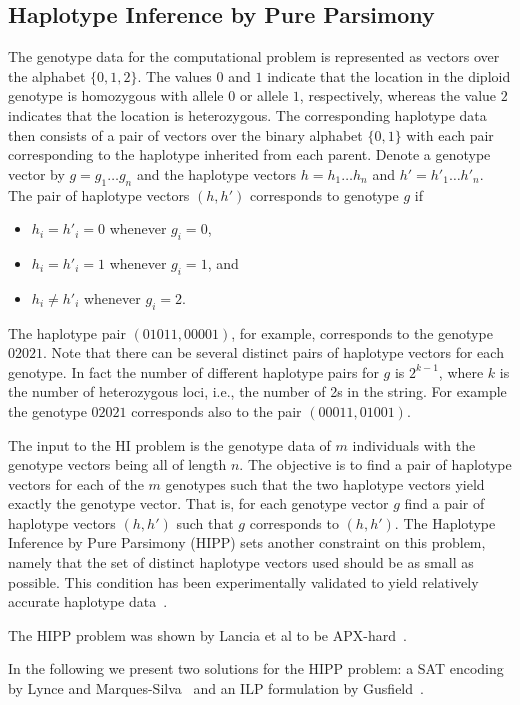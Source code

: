 \documentclass[12pt,a4paper]{article}
\begin{document}
\subsection{Haplotype Inference by Pure Parsimony}
The genotype data for the computational problem is represented as vectors over the alphabet $\{0, 1, 2\}$. 
The values $0$ and $1$ indicate that the location in the diploid genotype is homozygous with allele $0$ or allele $1$, respectively, 
whereas the value $2$ indicates that the location is heterozygous.
The corresponding haplotype data then consists of a pair of vectors over the binary alphabet $\{0, 1\}$ with each pair corresponding to the haplotype inherited from each parent.
Denote a genotype vector by $g=g_1\dots g_n$ and the haplotype vectors $h=h_1\dots h_n$ and $h'=h'_1\dots h'_n$.
The pair of haplotype vectors $(h, h')$ corresponds to genotype $g$ if 
\begin{itemize}
\item $h_i=h'_i=0$ whenever $g_i = 0$,
\item $h_i=h'_i=1$ whenever $g_i = 1$, and
\item $h_i \neq h'_i$ whenever $g_i = 2$.
\end{itemize}
The haplotype pair $(01011, 00001)$, for example, corresponds to the genotype $02021$.
Note that there can be several distinct pairs of haplotype vectors for each genotype.
In fact the number of different haplotype pairs for $g$ is $2^{k-1}$, where $k$ is the number of heterozygous loci, i.e., the number of 2s in the string.
For example the genotype $02021$ corresponds also to the pair $(00011, 01001)$.

The input to the HI problem is the genotype data of $m$ individuals with the genotype vectors being all of length $n$.
The objective is to find a pair of haplotype vectors for each of the $m$ genotypes such that the two haplotype vectors yield exactly the genotype vector.
That is, for each genotype vector $g$ find a pair of haplotype vectors $(h, h')$ such that $g$ corresponds to $(h, h')$.
The Haplotype Inference by Pure Parsimony (HIPP) sets another constraint on this problem, namely that the set of distinct haplotype vectors used should be as small as possible.
This condition has been experimentally validated to yield relatively accurate haplotype data~\cite{DBLP:journals/bioinformatics/WangX03a}.

The HIPP problem was shown by Lancia et al to be APX-hard~\cite{DBLP:journals/informs/LanciaPR04}.

In the following we present two solutions for the HIPP problem: a SAT encoding by Lynce and Marques-Silva~\cite{DBLP:conf/aaai/LynceM06} and an ILP formulation by Gusfield~\cite{DBLP:conf/cpm/Gusfield03}.
\end{document}
